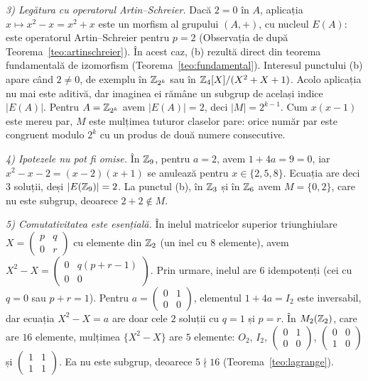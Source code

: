 \begin{solutie}
\emph{3) Legătura cu operatorul Artin--Schreier.} Dacă $2=0$ în $A$, aplicația
$x\mapsto x^{2}-x=x^{2}+x$ este un morfism al grupului $(A,+)$, cu nucleul
$E(A)$: este operatorul Artin--Schreier pentru $p=2$ (Observația de după
Teorema~\ref{teo:artinschreier}). În acest caz, (b) rezultă direct din teorema
fundamentală de izomorfism (Teorema~\ref{teo:fundamental}). Interesul punctului (b) apare când $2\neq0$, de
exemplu în $\mathbb{Z}_{2^{k}}$ sau în $\mathbb{Z}_{4}[X]/(X^{2}+X+1)$. Acolo aplicația nu
mai este aditivă, dar imaginea ei rămâne un subgrup de același indice
$|E(A)|$. Pentru $A=\mathbb{Z}_{2^{k}}$ avem $|E(A)|=2$, deci $|M|=2^{k-1}$. Cum
$x(x-1)$ este mereu par, $M$ este mulțimea tuturor claselor pare: orice număr
par este congruent modulo $2^{k}$ cu un produs de două numere consecutive.

\emph{4) Ipotezele nu pot fi omise.} În $\mathbb{Z}_{9}$, pentru $a=2$, avem
$1+4a=9=0$, iar $x^{2}-x-2=(x-2)(x+1)$ se anulează pentru $x\in\{2,5,8\}$.
Ecuația are deci $3$ soluții, deși $|E(\mathbb{Z}_{9})|=2$. La punctul (b), în $\mathbb{Z}_{3}$
și în $\mathbb{Z}_{6}$ avem $M=\{0,2\}$, care nu este subgrup, deoarece $2+2\notin M$.

\emph{5) Comutativitatea este esențială.} În inelul matricelor superior
triunghiulare $X=\begin{pmatrix}p&q\\0&r\end{pmatrix}$ cu elemente din
$\mathbb{Z}_{2}$ (un inel cu $8$ elemente), avem
$X^{2}-X=\begin{pmatrix}0&q(p+r-1)\\0&0\end{pmatrix}$. Prin urmare, inelul are
$6$ idempotenți (cei cu $q=0$ sau $p+r=1$). Pentru
$a=\begin{pmatrix}0&1\\0&0\end{pmatrix}$, elementul $1+4a=I_{2}$ este
inversabil, dar ecuația $X^{2}-X=a$ are doar cele $2$ soluții cu $q=1$ și
$p=r$. În $M_{2}(\mathbb{Z}_{2})$, care are $16$ elemente, mulțimea
$\{X^{2}-X\}$ are $5$ elemente: $O_{2}$, $I_{2}$,
$\begin{pmatrix}0&1\\0&0\end{pmatrix}$, $\begin{pmatrix}0&0\\1&0\end{pmatrix}$ și
$\begin{pmatrix}1&1\\1&1\end{pmatrix}$. Ea nu este subgrup, deoarece
$5\nmid16$ (Teorema~\ref{teo:lagrange}).
\end{solutie}

